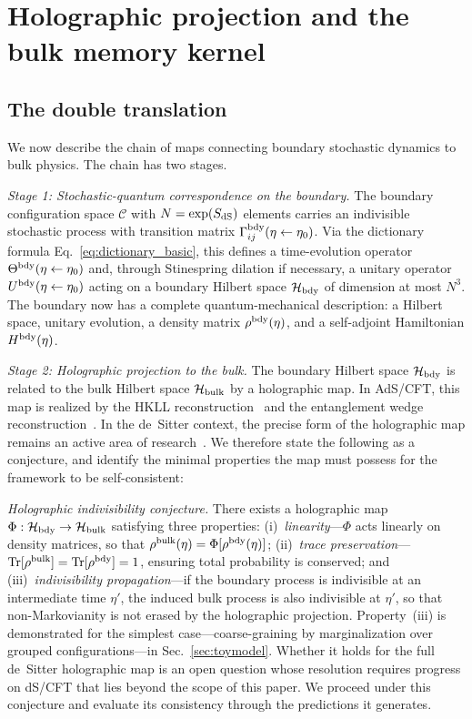 \documentclass[aps,prd,twocolumn,superscriptaddress,nofootinbib]{revtex4-2}
\begin{document}
\section{Holographic projection and the bulk memory kernel}
\label{sec:projection}

\subsection{The double translation}

We now describe the chain of maps connecting boundary stochastic dynamics to bulk physics. The chain has two stages.

\emph{Stage 1: Stochastic-quantum correspondence on the boundary.} The boundary configuration space $\mathcal{C}$ with $N = \exp(S_{\rm dS})$ elements carries an indivisible stochastic process with transition matrix $\Gamma^{\rm bdy}_{ij}(\eta \leftarrow \eta_0)$. Via the dictionary formula Eq.~\eqref{eq:dictionary_basic}, this defines a time-evolution operator $\Theta^{\rm bdy}(\eta \leftarrow \eta_0)$ and, through Stinespring dilation if necessary, a unitary operator $U^{\rm bdy}(\eta \leftarrow \eta_0)$ acting on a boundary Hilbert space $\mathcal{H}_{\rm bdy}$ of dimension at most $N^3$. The boundary now has a complete quantum-mechanical description: a Hilbert space, unitary evolution, a density matrix $\rho^{\rm bdy}(\eta)$, and a self-adjoint Hamiltonian $H^{\rm bdy}(\eta)$.

\emph{Stage 2: Holographic projection to the bulk.} The boundary Hilbert space $\mathcal{H}_{\rm bdy}$ is related to the bulk Hilbert space $\mathcal{H}_{\rm bulk}$ by a holographic map. In AdS/CFT, this map is realized by the HKLL reconstruction~\cite{HKLL2006} and the entanglement wedge reconstruction~\cite{Almheiri2015,Dong2016,Penington2020}. In the de~Sitter context, the precise form of the holographic map remains an active area of research~\cite{Strominger2001,AnniosdeSitter2011}. We therefore state the following as a conjecture, and identify the minimal properties the map must possess for the framework to be self-consistent:

\emph{Holographic indivisibility conjecture.} There exists a holographic map $\Phi: \mathcal{H}_{\rm bdy} \to \mathcal{H}_{\rm bulk}$ satisfying three properties: (i)~\emph{linearity}---$\Phi$ acts linearly on density matrices, so that $\rho^{\rm bulk}(\eta) = \Phi[\rho^{\rm bdy}(\eta)]$; (ii)~\emph{trace preservation}---$\text{Tr}[\rho^{\rm bulk}] = \text{Tr}[\rho^{\rm bdy}] = 1$, ensuring total probability is conserved; and (iii)~\emph{indivisibility propagation}---if the boundary process is indivisible at an intermediate time $\eta'$, the induced bulk process is also indivisible at $\eta'$, so that non-Markovianity is not erased by the holographic projection. Property~(iii) is demonstrated for the simplest case---coarse-graining by marginalization over grouped configurations---in Sec.~\ref{sec:toymodel}. Whether it holds for the full de~Sitter holographic map is an open question whose resolution requires progress on dS/CFT that lies beyond the scope of this paper. We proceed under this conjecture and evaluate its consistency through the predictions it generates.
\end{document}

